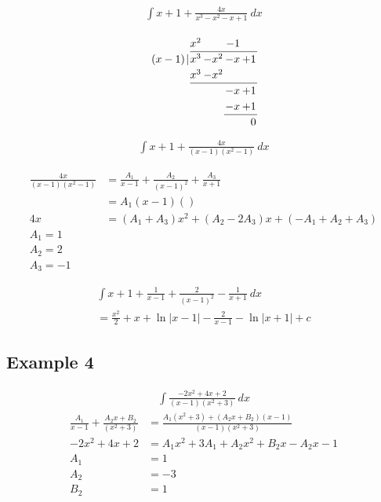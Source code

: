 \documentclass{article}
\theoremstyle{mytheoremstyle}
\theoremstyle{mytheoremstyle}
\theoremstyle{myproblemstyle}
\begin{document}
    \begin{align*}
        \int x+1+ \frac{4x}{x^3-x^2-x+1} \ dx
    \end{align*}

    \begin{align*}
        \arraycolsep=1pt
        \renewcommand\arraystretch{1.2}
        \begin{array}{*1r @{\hskip\arraycolsep}c@{\hskip\arraycolsep} *{11}r}
                  &   & x^2   &       & -1  & \\
            \cline{3-6}
            (x-1) & | & x^3   & -x^2  & -x  & +1 \\
                  &   & x^3   & -x^2 \\
            \cline{3-6}
                  &   &       &       & -x  & +1 \\
                  &   &       &       & -x  & +1 \\
            \cline{5-6}
                  &   &       &       &     & 0
        \end{array}
    \end{align*}
    \begin{align*}
        \int x+1+ \frac{4x}{(x-1)(x^2-1)} \ dx
    \end{align*}

    \begin{align*}
        \frac{4x}{(x-1)(x^2-1)}
        &= \frac{A_1}{x-1} + \frac{A_2}{(x-1)^2} + \frac{A_3}{x+1} \\
        &= A_1(x-1)() \\
        4x &= (A_1+A_3)x^2 + (A_2-2A_3)x + (-A_1+A_2 +A_3) \\
        A_1 = 1 \\
        A_2 = 2 \\
        A_3 = -1
    \end{align*}

    \begin{align*}
        \int x + 1 + \frac{1}{x-1} + \frac{2}{(x-1)^2} - \frac{1}{x+1} \ dx \\
        = \frac{x^2}{2} + x + \ln|x-1| -\frac{2}{x-1} - \ln|x+1| + c
    \end{align*}

    \subsection*{Example 4}
    \begin{align*}
        \int \frac{-2x^2+4x+2}{(x-1)(x^2+3)} \ dx
    \end{align*}
    \begin{align*}
        \frac{A_1}{x-1} + \frac{A_2x+B_2}{(x^2+3)}
        &= \frac{A_1(x^2+3) + (A_2x+B_2)(x-1)}{(x-1)(x^2+3)} \\
        -2x^2 + 4x+2 &= A_1x^2 + 3A_1 + A_2x^2 + B_2x -A_2x -1 \\
        A_1 &= 1 \\
        A_2 &= -3 \\
        B_2 &= 1
    \end{align*}
\end{document}

